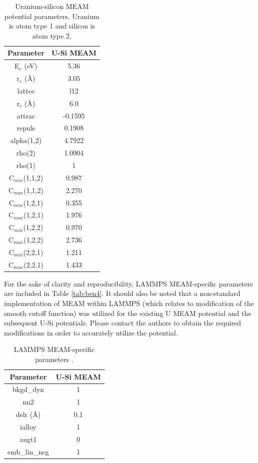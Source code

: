 \documentclass[review]{elsarticle}
\begin{document}
\begin{table}[h]
\caption{Uranium-silicon MEAM potential parameters.  Uranium is atom type 1 and silicon is atom type 2.}\label{tab:ben3}
\begin{center}
\begin{tabular}{|c|c|}
     \hline
     Parameter & U-Si MEAM \\
     \hline
     E$_{c}$ (eV) & 5.36 \\ 
     r$_{e}$ (\AA) & 3.05 \\
     lattce & l12 \\
     r$_{c}$ (\AA) & 6.0 \\
     attrac & -0.1595  \\
     repuls & 0.1908  \\
     alpha(1,2) & 4.7922  \\
     rho(2) & 1.0904 \\
     rho(1) & 1 \\
     C$_{min}$(1,1,2) & 0.987 \\
     C$_{max}$(1,1,2) & 2.270 \\
     C$_{min}$(1,2,1) & 0.355 \\
     C$_{max}$(1,2,1) & 1.976 \\
     C$_{min}$(1,2,2) & 0.970 \\
     C$_{max}$(1,2,2) & 2.736 \\
     C$_{min}$(2,2,1) & 1.211 \\  
     C$_{max}$(2,2,1) & 1.433 \\
     \hline
\end{tabular}
\end{center}
\label{default}
\end{table}%

For the sake of clarity and reproducibility, LAMMPS MEAM-specific parameters are included in Table \ref{tab:ben4}.  It should also be noted that a non-standard implementation of MEAM within LAMMPS (which relates to modification of the smooth cutoff function) was utilized for the existing U MEAM potential and the subsequent U-Si potentials.  Please contact the authors to obtain the required modifications in order to accurately utilize the potential.  

\begin{table}[h!]
\caption{LAMMPS MEAM-specific parameters \cite{plimpton1995}.}\label{tab:ben4}
\begin{center}
\begin{tabular}{|c|c|}
     \hline
     Parameter & U-Si MEAM  \\
     \hline
     bkgd\_dyn & 1 \\
     nn2 & 1 \\
     delr (\AA)& 0.1 \\
     ialloy & 1 \\
     augt1 & 0 \\
     emb\_lin\_neg & 1 \\
     \hline
\end{tabular}
\end{center}
\label{default}
\end{table}%
\end{document}
